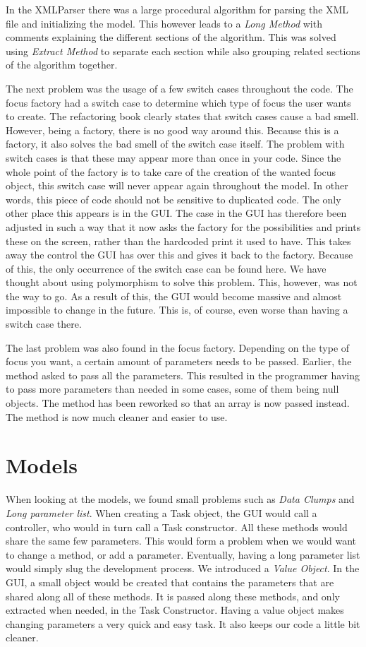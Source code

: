In the XMLParser there was a large procedural algorithm for parsing the XML file and initializing the model. This however leads to a \emph{Long Method} with comments explaining the different sections of the algorithm. This was solved using \emph{Extract Method} to separate each section while also grouping related sections of the algorithm together.

The next problem was the usage of a few switch cases throughout the code. The focus factory had a switch case to determine which type of focus the user wants to create. The refactoring book clearly states that switch cases cause a bad smell. However, being a factory, there is no good way around this. Because this is a factory, it also solves the bad smell of the switch case itself. The problem with switch cases is that these may appear more than once in your code. Since the whole point of the factory is to take care of the creation of the wanted focus object, this switch case will never appear again throughout the model.  In other words, this piece of code should not be sensitive to duplicated code. The only other place this appears is in the GUI. The case in the GUI has therefore been adjusted in such a way that it now asks the factory for the possibilities and prints these on the screen, rather than the hardcoded print it used to have. This takes away the control the GUI has over this and gives it back to the factory. Because of this, the only occurrence of the switch case can be found here. 
We have thought about using polymorphism to solve this problem. This, however, was not the way to go. As a result of this, the GUI would become massive and almost impossible to change in the future. This is, of course, even worse than having a switch case there.

The last problem was also found in the focus factory. Depending on the type of focus you want, a certain amount of parameters needs to be passed. Earlier, the method asked to pass all the parameters. This resulted in the programmer having to pass more parameters than needed in some cases, some of them being null objects. The method has been reworked so that an array is now passed instead. The method is now much cleaner and easier to use.

\section{Models}
When looking at the models, we found small problems such as \emph{Data Clumps}
and \emph{Long parameter list}.
When creating a Task object, the GUI would call a controller, who would in turn call a
Task constructor. All these methods would
share the same few parameters.
This would form a problem when we would want to change a method, or add a
parameter. Eventually, having a long parameter list would simply slug the
development process.
We introduced a \emph{Value Object}. In the GUI, a small object would be created that contains the parameters that are shared along all of these methods.
It is passed along these methods, and only extracted when needed, in the Task
Constructor.
Having a value object makes changing parameters a very quick and easy task. It
also keeps our code a little bit cleaner.

